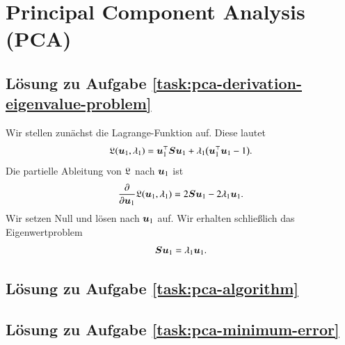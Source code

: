 \section{Principal Component Analysis (PCA)}

\subsection*{Lösung zu Aufgabe \ref{task:pca-derivation-eigenvalue-problem}}

Wir stellen zunächst die Lagrange-Funktion auf. Diese lautet
\begin{equation*}
	\mathfrak{L}(\bm{u}_1, \lambda_1)
		= \bm{u}_1^\top \bm{S} \bm{u}_1 + \lambda_1 \bigl( \bm{u}_1^\top \bm{u}_1 - 1 \bigr).
\end{equation*}
Die partielle Ableitung von $\mathfrak{L}$ nach $\bm{u}_1$ ist
\begin{equation*}
	\frac{\partial}{\partial \bm{u}_1} \mathfrak{L}(\bm{u}_1, \lambda_1)
		= 2 \bm{S} \bm{u}_1 - 2 \lambda_1 \bm{u}_1.
\end{equation*}
Wir setzen Null und lösen nach $\bm{u}_1$ auf. Wir erhalten schließlich das Eigenwertproblem
\begin{equation*}
	\bm{S} \bm{u}_1 = \lambda_1 \bm{u}_1.
\end{equation*}


\subsection*{Lösung zu Aufgabe \ref{task:pca-algorithm}}


\subsection*{Lösung zu Aufgabe \ref{task:pca-minimum-error}}




\newpage